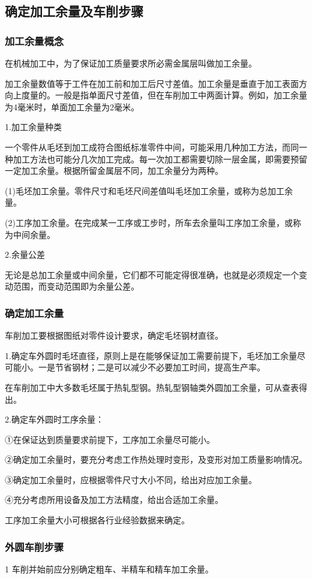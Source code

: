 \documentclass{ctexbook}
\begin{document}
\subsection{确定加工余量及车削步骤}
\subsubsection{加工余量概念}
在机械加工中，为了保证加工质量要求所必需金属层叫做加工余量。

加工余量数值等于工件在加工前和加工后尺寸差值。加工余量是垂直于加工表面方向上度量的。一般是指单面尺寸差值，但在车削加工中两面计算。例如，加工余量为4毫米时，单面加工余量为2毫米。

1.加工余量种类

一个零件从毛坯到加工成符合图纸标准零件中间，可能采用几种加工方法，而同一种加工方法也可能分几次加工完成。每一次加工都需要切除一层金属，即需要预留一定加工余量。根据所留金属层不同，加工余量分为两种。

(1)毛坯加工余量。零件尺寸和毛坯尺间差值叫毛坯加工余量，或称为总加工余量。

(2)工序加工余量。在完成某一工序或工步时，所车去余量叫工序加工余量，或称为中间余量。

2.余量公差

无论是总加工余量或中间余量，它们都不可能定得很准确，也就是必须规定一个变动范围，而变动范围即为余量公差。
\subsubsection{确定加工余量}
车削加工要根据图纸对零件设计要求，确定毛坯钢材直径。

1.确定车外圆时毛坯直径，原则上是在能够保证加工需要前提下，毛坯加工余量尽可能小。一是节省钢材；二是可以减少不必要加工时间，提高生产率。

在车削加工中大多数毛坯属于热轧型钢。热轧型钢轴类外圆加工余量，可从查表得出。

2.确定车外圆时工序余量：

①在保证达到质量要求前提下，工序加工余量尽可能小。

②确定加工余量时，要充分考虑工作热处理时变形，及变形对加工质量影响情况。

③确定加工余量时，应根据零件尺寸大小不同，给出对应加工余量。

④充分考虑所用设备及加工方法精度，给出合适加工余量。

工序加工余量大小可根据各行业经验数据来确定。
\subsubsection{外圆车削步骤}
1 车削并始前应分别确定粗车、半精车和精车加工余量。
\end{document}
